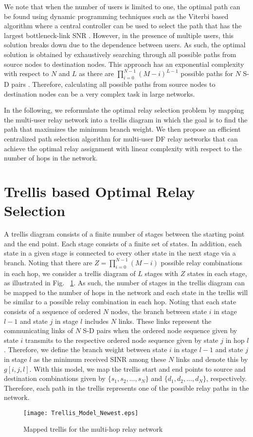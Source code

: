 \documentclass[12pt,draftclsnofoot,onecolumn]{IEEEtran}
\begin{document}
	We note that when the number of users is limited to one, the optimal path can be found using dynamic programming techniques such as the Viterbi based algorithm where a central controller can be used to select the path that has the largest bottleneck-link SNR \cite{5982498}. However, in the presence of multiple users, this solution breaks down due to the dependence between users. As such, the optimal solution is obtained by exhaustively searching through all possible paths from source nodes to destination nodes. This approach has an exponential complexity with respect to $N$ and $L$ as there are $\prod_{i=0}^{N-1} (M-i)^{L-1}$ possible paths for $N$ S-D pairs \cite{2809748}. Therefore, calculating all possible paths from source nodes to destination nodes can be a very complex task in large networks. 
	
	In the following, we reformulate the optimal relay selection problem by mapping the multi-user relay network into a trellis diagram in which the goal is to find the path that maximizes the minimum branch weight. We then propose an efficient centralized path selection algorithm for multi-user DF relay networks that can achieve the optimal relay assignment with linear complexity with respect to the number of hops in the network.
	
	\section{Trellis based Optimal Relay Selection}
	A trellis diagram consists of a finite number of stages between the starting point and the end point. Each stage consists of a finite set of states. In addition, each state in a given stage is connected to every other state in the next stage via a branch. Noting that there are $Z=\prod_{i=0}^{N-1}(M-i)$ possible relay combinations in each hop, we consider a trellis diagram of $L$ stages with $Z$ states in each stage, as illustrated in Fig.~ \ref{figure2}. As such, the number of stages in the trellis diagram can be mapped to the number of hops in the network and each state in the trellis will be similar to a possible relay combination in each hop. Noting that each state consists of a sequence of ordered $N$ nodes, the branch between state $i$ in stage $l-1$ and state $j$ in stage $l$ includes $N$ links. These links represent the communicating links of $N$ S-D pairs when the ordered node sequence given by state $i$ transmits to the respective ordered node sequence given by state $j$ in hop $l$. Therefore, we define the branch weight between state $i$ in stage $l-1$ and state $j$ in stage $l$ as the minimum received SINR among these $N$ links and denote this by $g[i,j,l]$. With this model, we map the trellis start and end points to source and destination combinations given by $\{s_1,s_2,...,s_N\}$ and $\{d_1,d_2,...,d_N\}$, respectively. Therefore, each path in the trellis represents one of the possible relay paths in the network.
	\begin{figure}
		\centering
		\texttt{[image: Trellis\_Model\_Newest.eps]}
		\centering\caption{Mapped trellis for the multi-hop relay network}
		\label{figure2}
	\end{figure}
	
\end{document}
